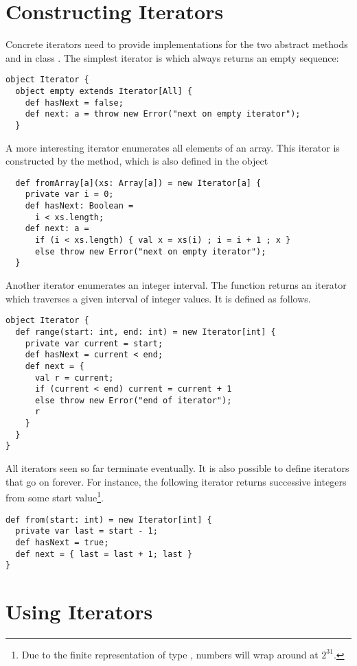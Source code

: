 {\section{Constructing Iterators}

Concrete iterators need to provide implementations for the two
abstract methods  and  in class
. The simplest iterator is  which
always returns an empty sequence:
\begin{lstlisting}
object Iterator {
  object empty extends Iterator[All] {
    def hasNext = false;
    def next: a = throw new Error("next on empty iterator");
  }
\end{lstlisting}
A more interesting iterator enumerates all elements of an array. This
iterator is constructed by the  method, which is also defined in the object 
\begin{lstlisting}
  def fromArray[a](xs: Array[a]) = new Iterator[a] {
    private var i = 0;
    def hasNext: Boolean = 
      i < xs.length;
    def next: a = 
      if (i < xs.length) { val x = xs(i) ; i = i + 1 ; x }
      else throw new Error("next on empty iterator");
  }
\end{lstlisting}
Another iterator enumerates an integer interval.  The
 function returns an iterator which traverses a
given interval of integer values. It is defined as follows.
\begin{lstlisting}
object Iterator {
  def range(start: int, end: int) = new Iterator[int] {
    private var current = start;
    def hasNext = current < end;
    def next = {
      val r = current;
      if (current < end) current = current + 1
      else throw new Error("end of iterator");
      r
    }
  }
}
\end{lstlisting}
All iterators seen so far terminate eventually. It is also possible to
define iterators that go on forever. For instance, the following
iterator returns successive integers from some start
value\footnote{Due to the finite representation of type ,
numbers will wrap around at $2^31$.}.
\begin{lstlisting}
def from(start: int) = new Iterator[int] {
  private var last = start - 1;
  def hasNext = true;
  def next = { last = last + 1; last }
}
\end{lstlisting}

\section{Using Iterators}

}
